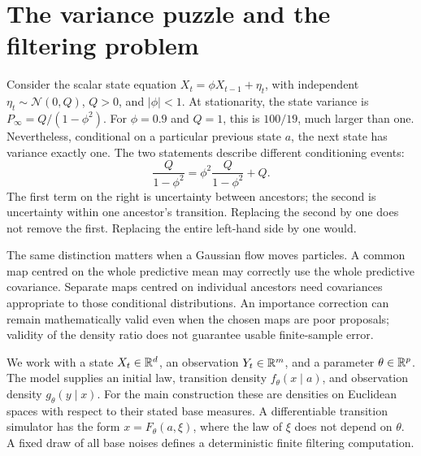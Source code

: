 \newcommand{\bfCovOne}{\mathbf 1}
\newcommand{\bfCovNormal}{\mathcal N}
\newcommand{\bfCovDiff}{\mathrm d}
\newcommand{\bfCovSPD}{\mathbb S_{++}}
\newcommand{\bfCovLSE}{\operatorname{LSE}}
\newcommand{\bfCovSoftmax}{\operatorname{softmax}}

\section{The variance puzzle and the filtering problem}

Consider the scalar state equation
\(X_t=\phi X_{t-1}+\eta_t\), with independent
\(\eta_t\sim\bfCovNormal(0,Q)\), \(Q>0\), and \(|\phi|<1\).
At stationarity, the state variance is \(P_\infty=Q/(1-\phi^2)\).
For \(\phi=0.9\) and \(Q=1\), this is \(100/19\), much larger than one.
Nevertheless, conditional on a particular previous state \(a\), the next
state has variance exactly one. The two statements describe different
conditioning events:
\begin{equation}
\label{eq:bf-covariance-proposal-ar1-total}
 \frac{Q}{1-\phi^2}
 =\phi^2\frac{Q}{1-\phi^2}+Q.
\end{equation}
The first term on the right is uncertainty between ancestors; the second is
uncertainty within one ancestor's transition. Replacing the second by one
does not remove the first. Replacing the entire left-hand side by one would.

The same distinction matters when a Gaussian flow moves particles. A common
map centred on the whole predictive mean may correctly use the whole
predictive covariance. Separate maps centred on individual ancestors need
covariances appropriate to those conditional distributions. An importance
correction can remain mathematically valid even when the chosen maps are
poor proposals; validity of the density ratio does not guarantee usable
finite-sample error.

We work with a state \(X_t\in\mathbb R^d\), an observation \(Y_t\in\mathbb R^m\), and a parameter
\(\theta\in\mathbb R^p\). The model supplies an initial law, transition density
\(f_\theta(x\mid a)\), and observation density \(g_\theta(y\mid x)\).
For the main construction these are densities on Euclidean spaces with
respect to their stated base measures. A differentiable transition simulator
has the form \(x=F_\theta(a,\xi)\), where the law of \(\xi\) does not depend
on \(\theta\). A fixed draw of all base noises defines a deterministic
finite filtering computation.


